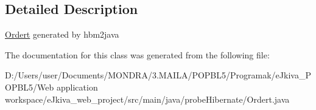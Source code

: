 \subsection{Detailed Description}
\mbox{\hyperlink{classprobe_hibernate_1_1_ordert}{Ordert}} generated by hbm2java 

The documentation for this class was generated from the following file\+:\begin{DoxyCompactItemize}
\item 
D\+:/\+Users/user/\+Documents/\+M\+O\+N\+D\+R\+A/3.\+M\+A\+I\+L\+A/\+P\+O\+P\+B\+L5/\+Programak/e\+Jkiva\+\_\+\+P\+O\+P\+B\+L5/\+Web application workspace/e\+Jkiva\+\_\+web\+\_\+project/src/main/java/probe\+Hibernate/Ordert.\+java\end{DoxyCompactItemize}
